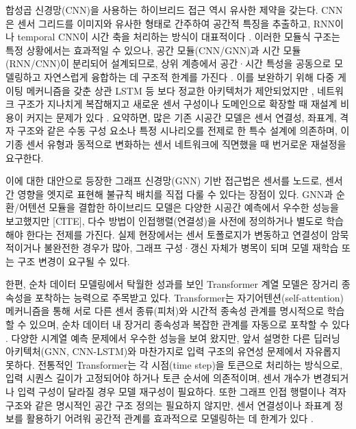 \documentclass[final,5p,times,twocolumn,authoryear]{elsarticle}
\begin{document}
합성곱 신경망(CNN)을 사용하는 하이브리드 접근 역시 유사한 제약을 갖는다. CNN은 센서 그리드를 이미지와 유사한 형태로 간주하여 공간적 특징을 추출하고, RNN이나 temporal CNN이 시간 축을 처리하는 방식이 대표적이다 \cite{shi2015convlstm}. 이러한 모듈식 구조는 특정 상황에서는 효과적일 수 있으나, 공간 모듈(CNN/GNN)과 시간 모듈(RNN/CNN)이 분리되어 설계되므로, 상위 계층에서 공간·시간 특성을 공동으로 모델링하고 자연스럽게 융합하는 데 구조적 한계를 가진다 \cite{shi2015convlstm}. 이를 보완하기 위해 다중 게이팅 메커니즘을 갖춘 상관 LSTM 등 보다 정교한 아키텍처가 제안되었지만 \cite{jing2019mlclstm}, 네트워크 구조가 지나치게 복잡해지고 새로운 센서 구성이나 도메인으로 확장할 때 재설계 비용이 커지는 문제가 있다 \cite{jing2019mlclstm}. 요약하면, 많은 기존 시공간 모델은 센서 연결성, 좌표계, 격자 구조와 같은 수동 구성 요소나 특정 시나리오를 전제로 한 특수 설계에 의존하며, 이기종 센서 유형과 동적으로 변화하는 센서 네트워크에 직면했을 때 번거로운 재설정을 요구한다.


이에 대한 대안으로 등장한 그래프 신경망(GNN)\cite{scarselli2009tcnn_gnn} 기반 접근법은 센서를 노드로, 센서 간 영향을 엣지로 표현해 불규칙 배치를 직접 다룰 수 있다는 장점이 있다. GNN과 순환/어텐션 모듈을 결합한 하이브리드 모델은 다양한 시공간 예측에서 우수한 성능을 보고했지만 [CITE], 다수 방법이 인접행렬(연결성)을 사전에 정의하거나 별도로 학습해야 한다는 전제를 가진다. 실제 현장에서는 센서 토폴로지가 변동하고 연결성이 암묵적이거나 불완전한 경우가 많아, 그래프 구성·갱신 자체가 병목이 되며 모델 재학습 또는 구조 변경이 요구될 수 있다.

한편, 순차 데이터 모델링에서 탁월한 성과를 보인 Transformer 계열 모델은 장거리 종속성을 포착하는 능력으로 주목받고 있다\cite{vaswani2017transformer,zhou2020informer}. Transformer는 자기어텐션(self-attention) 메커니즘을 통해 서로 다른 센서 종류(피처)와 시간적 종속성 관계를 명시적으로 학습할 수 있으며, 순차 데이터 내 장거리 종속성과 복잡한 관계를 자동으로 포착할 수 있다 \cite{vaswani2017transformer}. 다양한 시계열 예측 문제에서 우수한 성능을 보여 왔지만, 앞서 설명한 다른 딥러닝 아키텍처(GNN, CNN-LSTM)와 마찬가지로 입력 구조의 유연성 문제에서 자유롭지 못하다. 전통적인 Transformer는 각 시점(time step)을 토큰으로 처리하는 방식으로, 입력 시퀀스 길이가 고정되어야 하거나 토큰 순서에 의존적이며, 센서 개수가 변경되거나 입력 구성이 달라질 경우 모델 재구성이 필요하다. 또한 그래프 인접 행렬이나 격자 구조와 같은 명시적인 공간 구조 정의는 필요하지 않지만, 센서 연결성이나 좌표계 정보를 활용하기 어려워 공간적 관계를 효과적으로 모델링하는 데 한계가 있다 \cite{zhou2020informer,liu2023itransformer}.
\end{document}
